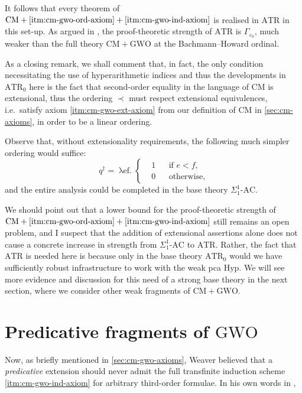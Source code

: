 \documentclass[12pt,openany]{book}
\theoremstyle{plain}
\theoremstyle{definition}
\newcommand\oplam[1]{\mathop{\lambda #1.}}
\newcommand\ATR{\mathrm{ATR}}
\newcommand\AC{\text{-}\mathrm{AC}}
\newcommand\CM{\mathrm{CM}}
\newcommand\GWO{\mathrm{GWO}}
\newcommand\Hyp{\mathrm{Hyp}}
\begin{document}
It follows that every theorem of $\CM + \text{\ref{itm:cm-gwo-ord-axiom}} + \text{\ref{itm:cm-gwo-ind-axiom}}$ is realised in $\ATR$ in this set-up. As argued in \cite{jager-strahm00-fixed-point}, the proof-theoretic strength of $\ATR$ is $\Gamma_{\varepsilon_0}$, much weaker than the full theory $\CM + \GWO$ at the Bachmann--Howard ordinal.

As a closing remark, we shall comment that, in fact, the only condition necessitating the use of hyperarithmetic indices and thus the developments in $\ATR_0$ here is the fact that second-order equality in the language of $\CM$ is extensional, thus the ordering $\prec$ must respect extensional equivalences, i.e.\ satisfy axiom \ref{itm:cm-gwo-ext-axiom} from our definition of $\CM$ in \autoref{sec:cm-axioms}, in order to be a linear ordering.

Observe that, without extensionality requirements, the following much simpler ordering would suffice:
\[q^\dagger = \oplam{ef} \left\{\begin{aligned}
     & 1 &  & \text{if $e < f$}, \\
     & 0 &  & \text{otherwise},
  \end{aligned}\right.\]
and the entire analysis could be completed in the base theory $\Sigma^1_1\AC$.

We should point out that a lower bound for the proof-theoretic strength of $\CM + \text{\ref{itm:cm-gwo-ord-axiom}} + \text{\ref{itm:cm-gwo-ind-axiom}}$ still remains an open problem, and I suspect that the addition of extensional assertions alone does not cause a concrete increase in strength from $\Sigma^1_1\AC$ to $\ATR$. Rather, the fact that $\ATR$ is needed here is because only in the base theory $\ATR_0$ would we have sufficiently robust infrastructure to work with the weak pca $\Hyp$. We will see more evidence and discussion for this need of a strong base theory in the next section, where we consider other weak fragments of $\CM + \GWO$.

\section{Predicative fragments of \texorpdfstring{$\GWO$}{GWO}}
\label{sec:cm-gwo-pred}

Now, as briefly mentioned in \autoref{sec:cm-gwo-axioms}, Weaver believed that a \emph{predicative} extension should never admit the full transfinite induction scheme \ref{itm:cm-gwo-ind-axiom} for arbitrary third-order formulae. In his own words in \cite{weaver09-cm},
\end{document}
